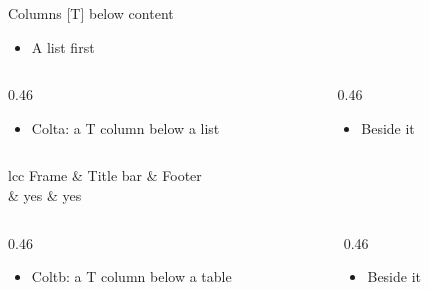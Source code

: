 \begin{standardframe}{Columns [T] below content}
	\begin{itemize}
		\item A list first
	\end{itemize}
	\begin{columns}[T,onlytextwidth]
		\begin{column}{0.46\linewidth}
			\begin{itemize}
				\item Colta: a T column below a list
			\end{itemize}
		\end{column}
		\begin{column}{0.46\linewidth}
			\begin{itemize}
				\item Beside it
			\end{itemize}
		\end{column}
	\end{columns}
	\begin{SMTable}[gap=12pt]{lcc}
		\toprule
		Frame & Title bar & Footer \\
		\midrule
		 & yes & yes \\
		\bottomrule
	\end{SMTable}
	\begin{columns}[T,onlytextwidth]
		\begin{column}{0.46\linewidth}
			\begin{itemize}
				\item Coltb: a T column below a table
			\end{itemize}
		\end{column}
		\begin{column}{0.46\linewidth}
			\begin{itemize}
				\item Beside it
			\end{itemize}
		\end{column}
	\end{columns}
\end{standardframe}
